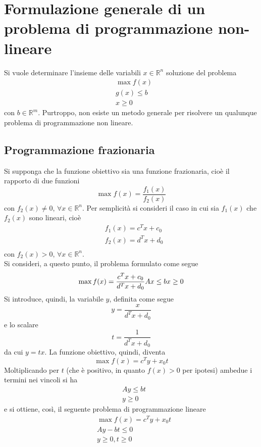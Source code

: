 \documentclass[a4paper]{extarticle}
\begin{document}
\section{Formulazione generale di un problema di programmazione non-lineare}
Si vuole determinare l'insieme delle variabili $x \in \mathbb{R}^n$ soluzione del problema
\begin{align*}
    &\max f(x)\\
    &g(x) \leq b\\
    &x\geq 0
\end{align*}
con $b \in \mathbb{R}^m$. Purtroppo, non esiste un metodo generale per risolvere un qualunque problema di programmazione non lineare.

\vspace{1em}
\noindent
\subsection{Programmazione frazionaria}
Si supponga che la funzione obiettivo sia una funzione frazionaria, cioè il rapporto di due funzioni
\[\max f(x)= \frac{f_1(x)}{f_2 (x)}\]
con $f_2(x) \neq 0$, $\forall x \in \mathbb{R}^n$. Per semplicità si consideri il caso in cui sia $f_1(x)$ che $f_2(x)$ sono
lineari, cioè
\begin{align*}
    &f_1(x)=c^T x + c_0\\
    &f_2(x)=d^T x + d_0\\
\end{align*}
con $f_2(x) > 0$, $\forall x \in \mathbb{R}^n$.\\
Si consideri, a questo punto, il problema formulato come segue
\[
    \max f(x) = \dfrac{c^T x + c_0}{d^T x + d_0}\\
    A x \leq b\\
    x \geq 0
\]
Si introduce, quindi, la variabile $y$, definita come segue
\[y=\dfrac{x}{d^T x + d_0}\]
e lo scalare
\[t=\dfrac{1}{d^T x + d_0}\]
da cui $y=tx$. La funzione obiettivo, quindi, diventa
\[\max f(x) = c^T y + x_0 t\]
Moltiplicando per $t$ (che è positivo, in quanto $f(x) > 0$ per ipotesi) ambedue i termini nei vincoli si ha
\begin{align*}
    &A y \leq b t\\
    &y \geq 0
\end{align*}
e si ottiene, così, il seguente problema di programmazione lineare
\begin{align*}
    &\max f(x) = c^T y + x_0 t\\
    &Ay - bt \leq 0\\
    &y \geq 0, t \geq 0\\
\end{align*}
\end{document}
